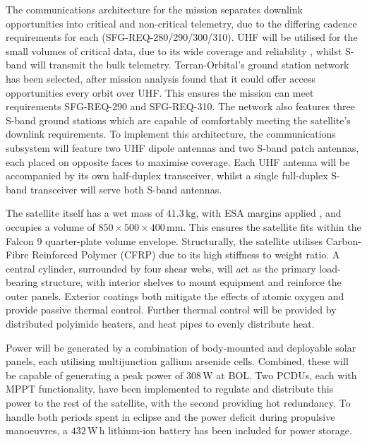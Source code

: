 \documentclass[a4paper, 11pt, conference]{IEEEtran}
\begin{document}
The communications architecture for the mission separates downlink opportunities into critical and non-critical telemetry, due to the differing cadence requirements for each (SFG-REQ-280/290/300/310). UHF\label{nom:uhf} will be utilised for the small volumes of critical data, due to its wide coverage and reliability \cite{ippolito_satellite_2017}, whilst S-band will transmit the bulk telemetry. Terran-Orbital's ground station network has been selected, after mission analysis found that it could offer access opportunities every orbit over UHF. This ensures the mission can meet requirements SFG-REQ-290 and SFG-REQ-310. The network also features three S-band ground stations which are capable of comfortably meeting the satellite's downlink requirements. To implement this architecture, the communications subsystem will feature two UHF dipole antennas and two S-band patch antennas, each placed on opposite faces to maximise coverage. Each UHF antenna will be accompanied by its own half-duplex transceiver, whilst a single full-duplex S-band transceiver will serve both S-band antennas.

The satellite itself has a wet mass of $41.3\,\mathrm{kg}$, with ESA margins applied \cite{noauthor_sre-pa2011097_2012}, and occupies a volume of $850\times500\times400\,\mathrm{mm}$. This ensures the satellite fits within the Falcon 9 quarter-plate volume envelope. Structurally, the satellite utilises Carbon-Fibre Reinforced Polymer (CFRP)\label{nom:cfrp} due to its high stiffness to weight ratio. A central cylinder, surrounded by four shear webs, will act as the primary load-bearing structure, with interior shelves to mount equipment and reinforce the outer panels. Exterior coatings both mitigate the effects of atomic oxygen and provide passive thermal control. Further thermal control will be provided by distributed polyimide heaters, and heat pipes to evenly distribute heat.

Power will be generated by a combination of body-mounted and deployable solar panels, each utilising multijunction gallium arsenide cells. Combined, these will be capable of generating a peak power of $308\,\mathrm{W}$ at BOL\label{nom:bol}. Two PCDUs\label{nom:pcdu}, each with MPPT\label{nom:mppt} functionality, have been implemented to regulate and distribute this power to the rest of the satellite, with the second providing hot redundancy. To handle both periods spent in eclipse and the power deficit during propulsive manoeuvres, a $432\,\mathrm{W\,h}$ lithium-ion battery has been included for power storage.
\end{document}
